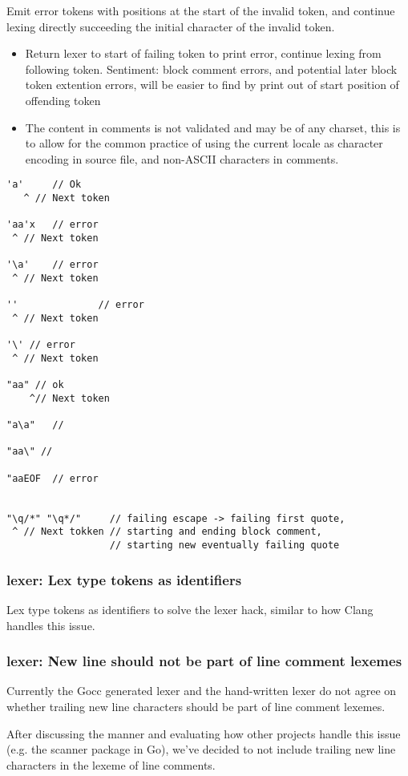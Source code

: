 
Emit error tokens with positions at the start of the invalid token, and continue lexing directly succeeding the initial character of the invalid token.


\begin{itemize}
	\item Return lexer to start of failing token to print error, continue lexing from following token.
	Sentiment: block comment errors, and potential later block token extention errors, will be easier to find by print out of start position of offending token
	\item The content in comments is not validated and may be of any charset, this is to allow for the common practice of using the current locale as character encoding in source file, and non-ASCII characters in comments.
\end{itemize}

\begin{verbatim}
'a'     // Ok
   ^ // Next token

'aa'x   // error
 ^ // Next token

'\a'    // error
 ^ // Next token

''              // error
 ^ // Next token

'\' // error
 ^ // Next token

"aa" // ok
    ^// Next token

"a\a"   //

"aa\" //

"aaEOF  // error


"\q/*" "\q*/"     // failing escape -> failing first quote,
 ^ // Next tokken // starting and ending block comment,
                  // starting new eventually failing quote
\end{verbatim}

\subsubsection{lexer: Lex type tokens as identifiers}


Lex type tokens as identifiers to solve the lexer hack, similar to how Clang handles this issue.

\subsubsection{lexer: New line should not be part of line comment lexemes}


Currently the Gocc generated lexer and the hand-written lexer do not agree on whether trailing new line characters should be part of line comment lexemes.

After discussing the manner and evaluating how other projects handle this issue (e.g. the scanner package in Go), we've decided to not include trailing new line characters in the lexeme of line comments.

